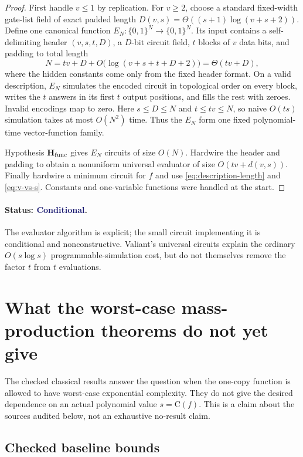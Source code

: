 \documentclass[11pt]{article}
\theoremstyle{definition}
\newcommand{\bits}{\{0,1\}}
\newcommand{\C}{\mathrm{C}}
\newcommand{\conditional}{\textcolor{MidnightBlue}{\textbf{Conditional}}}
\begin{document}
\begin{proof}
First handle $v\le1$ by replication.  For $v\ge2$, choose a standard
fixed-width gate-list field of exact padded length
$D(v,s)=\Theta((s+1)\log(v+s+2))$.  Define one canonical function
$E_N:\bits^N\to\bits^N$.  Its input contains a self-delimiting header
$(v,s,t,D)$, a $D$-bit circuit field, $t$ blocks of $v$ data bits, and padding
to total length
\[
  N=tv+D+O\bigl(\log(v+s+t+D+2)\bigr)=\Theta(tv+D),
\]
where the hidden constants come only from the fixed header format.  On a valid
description, $E_N$ simulates the encoded
circuit in topological order on every block, writes the $t$ answers in its
first $t$ output positions, and fills the rest with zeroes.  Invalid encodings
map to zero.  Here $s\le D\le N$ and $t\le tv\le N$, so naive $O(ts)$
simulation takes at most $O(N^2)$ time.  Thus the $E_N$ form one fixed
polynomial-time vector-function family.

Hypothesis $\mathbf H_{\rm func}$ gives $E_N$ circuits of size $O(N)$.
Hardwire the header and padding to obtain a nonuniform universal evaluator of
size $O(tv+d(v,s))$.  Finally hardwire a minimum circuit for $f$ and use
\eqref{eq:description-length} and \eqref{eq:v-vs-s}.  Constants and
one-variable functions were handled at the start.
\end{proof}

\paragraph{Status: \conditional.}
The evaluator algorithm is explicit; the small circuit implementing it is
conditional and nonconstructive.  Valiant's universal circuits
\cite{Valiant1976} explain the ordinary $O(s\log s)$ programmable-simulation
cost, but do not themselves remove the factor $t$ from $t$ evaluations.

\section{What the worst-case mass-production theorems do not yet give}
\label{sec:literature}

The checked classical results answer the question when the one-copy function
is allowed to have worst-case exponential complexity.  They do not give the
desired dependence on an actual polynomial value $s=\C(f)$.  This is a claim
about the sources audited below, not an exhaustive no-result claim.

\subsection{Checked baseline bounds}
\end{document}

